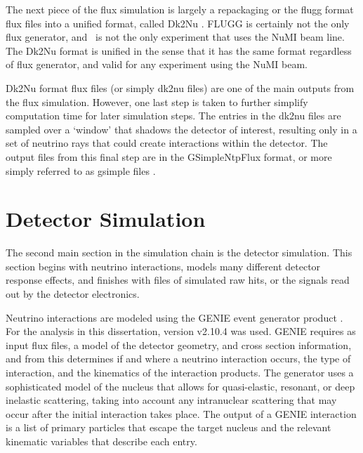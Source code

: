The next piece of the flux simulation is largely a repackaging or the flugg format flux files into a unified format, called Dk2Nu \cite{ref:Dk2Nu}. FLUGG is certainly not the only flux generator, and \nova~is not the only experiment that uses the NuMI beam line. The Dk2Nu format is unified in the sense that it has the same format regardless of flux generator, and valid for any experiment using the NuMI beam.

Dk2Nu format flux files (or simply dk2nu files) are one of the main outputs from the flux simulation. However, one last step is taken to further simplify computation time for later simulation steps. The entries in the dk2nu files are sampled over a `window' that shadows the detector of interest, resulting only in a set of neutrino rays that could create interactions within the detector. The output files from this final step are in the GSimpleNtpFlux format, or more simply referred to as gsimple files \cite{ref:gsimple}.

\section{Detector Simulation}
\label{sec:SimDet}

The second main section in the simulation chain is the detector simulation. This section begins with neutrino interactions, models many different detector response effects, and finishes with files of simulated raw hits, or the signals read out by the detector electronics.

Neutrino interactions are modeled using the GENIE event generator product \cite{ref:GENIEGen, ref:GENIE}. For the analysis in this dissertation, version v2.10.4 was used. GENIE requires as input flux files, a model of the detector geometry, and cross section information, and from this determines if and where a neutrino interaction occurs, the type of interaction, and the kinematics of the interaction products. The generator uses a sophisticated model of the nucleus that allows for quasi-elastic, resonant, or deep inelastic scattering, taking into account any intranuclear scattering that may occur after the initial interaction takes place. The output of a GENIE interaction is a list of primary particles that escape the target nucleus and the relevant kinematic variables that describe each entry.

